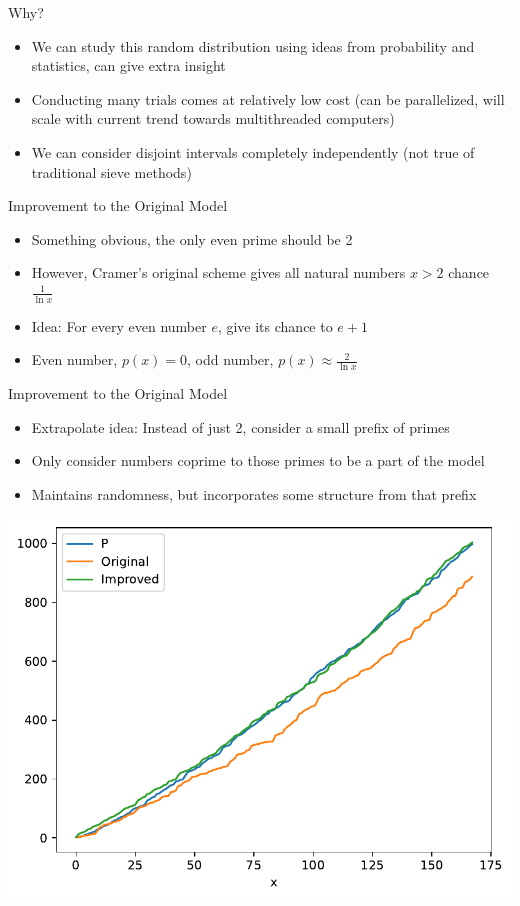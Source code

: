 \documentclass{beamer}
\begin{document}
\begin{frame}{Why?}
  \begin{itemize}
    \item We can study this random distribution using ideas from probability and statistics, can give extra insight
    \item Conducting many trials comes at relatively low cost (can be parallelized, will scale with current trend towards multithreaded computers)
    \item We can consider disjoint intervals completely independently (not true of traditional sieve methods)
  \end{itemize}
\end{frame}
\begin{frame}{Improvement to the Original Model}
  \begin{itemize}
      \item Something obvious, the only even prime should be 2
      \item However, Cramer's original scheme gives all natural numbers $x > 2$ chance $\frac{1}{\ln{x}}$
      \item Idea: For every even number $e$, give its chance to $e + 1$
      \item Even number, $p(x) = 0$, odd number, $p(x) \approx \frac{2}{\ln{x}}$
  \end{itemize}
\end{frame}
\begin{frame}{Improvement to the Original Model}
    \begin{itemize}
        \item Extrapolate idea: Instead of just 2, consider a small prefix of primes
        \item Only consider numbers coprime to those primes to be a part of the model
        \item Maintains randomness, but incorporates some structure from that prefix
    \end{itemize}
\end{frame}
\begin{frame}
    \includegraphics[width=\textwidth]{../images/Improvement.pdf}
\end{frame}
\end{document}
